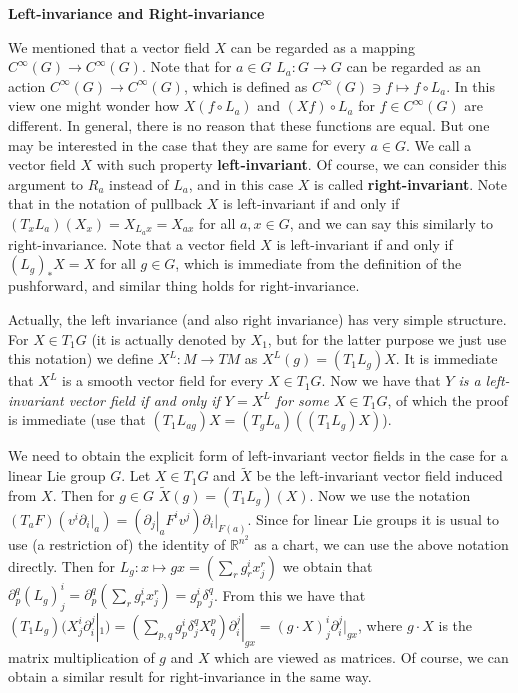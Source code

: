 \documentclass{article}
\newcommand{\ReR}{\mathbb{R}}
\newcommand{\spbar}[2]{\left.\partial_{#1}\right|_{#2}}
\begin{document}
\newpage



\newpage

\textbf{Left-invariance and Right-invariance}

We mentioned that a vector field $X$ can be regarded as a mapping $C^\infty(G) \to C^\infty(G)$.
Note that for $a \in G$ $L_a : G \to G$ can be regarded as an action $C^\infty(G) \to C^\infty(G)$, which is defined as $C^\infty(G) \ni f \mapsto f \circ L_a$.
In this view one might wonder how $X(f \circ L_a)$ and $(Xf) \circ L_a$ for $f \in C^\infty(G)$ are different.
In general, there is no reason that these functions are equal.
But one may be interested in the case that they are same for every $a \in G$.
We call a vector field $X$ with such property \textbf{left-invariant}.
Of course, we can consider this argument to $R_a$ instead of $L_a$, and in this case $X$ is called \textbf{right-invariant}.
Note that in the notation of pullback $X$ is left-invariant if and only if $(T_x L_a)(X_x) = X_{L_a x} = X_{ax}$ for all $a, x \in G$, and we can say this similarly to right-invariance.
Note that a vector field $X$ is left-invariant if and only if $(L_g)_* X = X$ for all $g \in G$, which is immediate from the definition of the pushforward, and similar thing holds for right-invariance.

Actually, the left invariance (and also right invariance) has very simple structure.
For $X \in T_1 G$ (it is actually denoted by $X_1$, but for the latter purpose we just use this notation) we define $X^L : M \to TM$ as $X^L(g) = (T_1 L_g) X$.
It is immediate that $X^L$ is a smooth vector field for every $X \in T_1 G$.
Now we have that \textit{$Y$ is a left-invariant vector field if and only if $Y = X^L$ for some $X \in T_1 G$}, of which the proof is immediate (use that $(T_1 L_{ag}) X = (T_g L_a) ((T_1 L_g) X)$).

We need to obtain the explicit form of left-invariant vector fields in the case for a linear Lie group $G$.
Let $X \in T_1 G$ and $\tilde{X}$ be the left-invariant vector field induced from $X$.
Then for $g \in G$ $\tilde{X}(g) = (T_1 L_g)(X)$.
Now we use the notation $(T_a F) (v^i \spbar{i}{a}) = (\spbar{j}{a} F^i v^j) \spbar{i}{F(a)}$.
Since for linear Lie groups it is usual to use (a restriction of) the identity of $\ReR^{n^2}$ as a chart, we can use the above notation directly.
Then for $L_g : x \mapsto gx = (\sum_r g^i_r x^r_j)$ we obtain that $\partial_p^q (L_g)^i_j = \partial_p^q (\sum_r g^i_r x^r_j) = g^i_p \delta^q_j$.
From this we have that $(T_1 L_g) (X^i_j \partial_i^j |_{1}) = (\sum_{p, q} g^i_p \delta^q_j X^p_q) \partial_i^j |_{gx} = (g \cdot X)^i_j \partial_i^j |_{gx}$, where $g \cdot X$ is the matrix multiplication of $g$ and $X$ which are viewed as matrices.
Of course, we can obtain a similar result for right-invariance in the same way.
\end{document}
